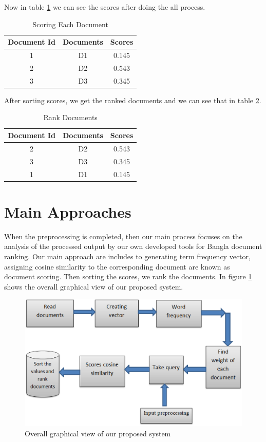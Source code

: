 Now in table \ref{tab:Scoring} we can see the scores after doing the all process.

\begin{table}[htp]	
\centering

\caption{Scoring Each Document  }
\vspace{0.5cm}
\begin{tabular}{|c|c|c|} 
\hline

	Document Id & Documents & Scores \\ \hline
 1 & D1 &	0.145   \\ \hline
 2 & D2 & 0.543   \\ \hline
 3 & D3  &0.345   \\ \hline


\end{tabular}
\label{tab:Scoring}
\end{table}

After sorting scores, we get the ranked documents and we can see that in table \ref{tab:Rank}.


\begin{table}[htp]	
\centering
\caption{Rank Documents  }
\vspace{0.5cm}
\begin{tabular}{|c|c|c|} 
\hline

Document Id & Documents & Scores \\ \hline
 2 & D2 &	0.543   \\ \hline
 3 & D3 & 0.345   \\ \hline
 1 & D1 &0.145  \\ \hline


\end{tabular}
\label{tab:Rank}
\end{table}


\section{Main Approaches}

When the preprocessing is completed, then our main process focuses on the analysis of the processed output by our own developed tools for Bangla document ranking. Our main approach are includes to generating term frequency vector, assigning cosine similarity to the corresponding document are known as document scoring. Then sorting the scores, we rank the documents. In figure \ref{Figure:graphical} shows the overall graphical view of our proposed system.

\begin{figure}[htp]
	\centering
		\includegraphics[width=.65\textwidth]{figure/five.eps}
	\caption{Overall graphical view of our proposed system}
	\label{Figure:graphical}
\end{figure}

